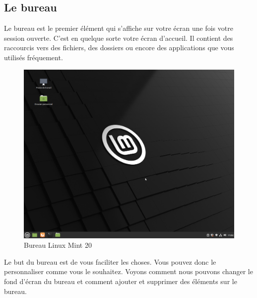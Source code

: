 \documentclass[12pt]{book}
\begin{document}
	\subsection{Le bureau}\label{sec:bureau}
		Le bureau est le premier élément qui s'affiche sur votre écran une fois votre session ouverte.
		C'est en quelque sorte votre écran d'accueil.
		Il contient des raccourcis vers des fichiers, des dossiers ou encore des applications que vous utilisés fréquement.
		\begin{figure}[h]
			\centering
			\includegraphics[width=\textwidth]{include/bureau.png}
			\caption{Bureau Linux Mint 20}
			\label{fig:bureau}
		\end{figure}\par
		Le but du bureau est de vous faciliter les choses.
		Vous pouvez donc le personnaliser comme vous le souhaitez.
		Voyons comment nous pouvons changer le fond d'écran du bureau et comment ajouter et supprimer des éléments sur le bureau.
\end{document}

